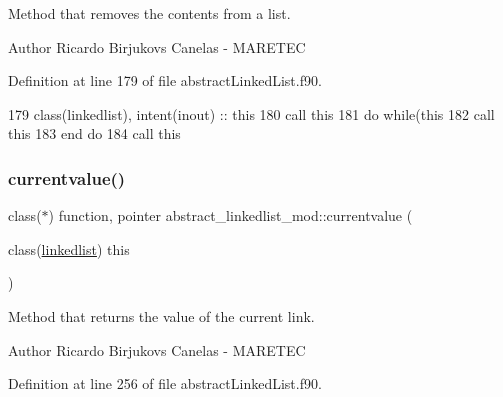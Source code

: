 Method that removes the contents from a list. 

\begin{DoxyAuthor}{Author}
Ricardo Birjukovs Canelas -\/ M\+A\+R\+E\+T\+EC 
\end{DoxyAuthor}


Definition at line 179 of file abstract\+Linked\+List.\+f90.


\begin{DoxyCode}
179     \textcolor{keywordtype}{class}(linkedlist), \textcolor{keywordtype}{intent(inout)} :: this
180     \textcolor{keyword}{call }this%
181     \textcolor{keywordflow}{do} \textcolor{keywordflow}{while}(this%
182         \textcolor{keyword}{call }this%
183 \textcolor{keywordflow}{    end do}
184     \textcolor{keyword}{call }this%
\end{DoxyCode}
\mbox{\label{namespaceabstract__linkedlist__mod_a87a81a4be29c8d4e8d2fb0d02247033b}} 
\subsubsection{\texorpdfstring{currentvalue()}{currentvalue()}}
{\footnotesize\ttfamily class($\ast$) function, pointer abstract\+\_\+linkedlist\+\_\+mod\+::currentvalue (\begin{DoxyParamCaption}\item[{class(\mbox{\hyperlink{structabstract__linkedlist__mod_1_1linkedlist}{linkedlist}})}]{this }\end{DoxyParamCaption})\hspace{0.3cm}{\ttfamily [private]}}



Method that returns the value of the current link. 

\begin{DoxyAuthor}{Author}
Ricardo Birjukovs Canelas -\/ M\+A\+R\+E\+T\+EC 
\end{DoxyAuthor}


Definition at line 256 of file abstract\+Linked\+List.\+f90.


